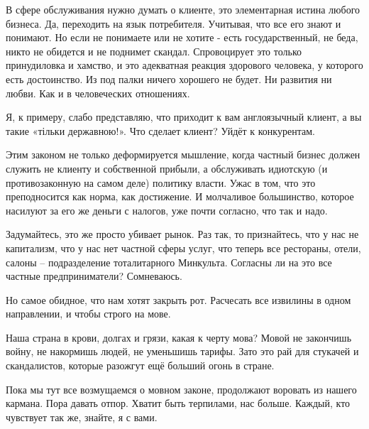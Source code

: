 В сфере обслуживания нужно думать о клиенте, это элементарная истина любого
бизнеса. Да, переходить на язык потребителя. Учитывая, что все его знают и
понимают. Но если не понимаете или не хотите - есть государственный, не беда,
никто не обидется и не поднимет скандал. Спровоцирует это только принудиловка и
хамство, и это адекватная реакция здорового человека, у которого есть
достоинство. Из под палки ничего хорошего не будет. Ни развития ни любви. Как и
в человеческих отношениях.

Я, к примеру, слабо представляю, что приходит к вам англоязычный клиент, а вы
такие «тільки державною!». Что сделает клиент? Уйдёт к конкурентам. 

Этим законом не только деформируется мышление, когда частный бизнес должен
служить не клиенту и собственной прибыли, а обслуживать идиотскую (и
противозаконную на самом деле) политику власти. Ужас в том, что это
преподносится как норма, как достижение. И молчаливое большинство, которое
насилуют за его же деньги с налогов, уже почти согласно, что так и надо.  

Задумайтесь, это же просто убивает рынок. Раз так, то признайтесь, что у нас не
капитализм, что у нас нет частной сферы услуг, что теперь все рестораны, отели,
салоны – подразделение тоталитарного Минкульта. Согласны ли на это все частные
предприниматели? Сомневаюсь.

Но самое обидное, что нам хотят закрыть рот. Расчесать все извилины в одном
направлении, и чтобы строго на мове. 

Наша страна в крови, долгах и грязи, какая к черту мова? Мовой не закончишь
войну, не накормишь людей, не уменьшишь тарифы. Зато это рай для стукачей и
скандалистов, которые разожгут ещё больший огонь в стране. 

Пока мы тут все возмущаемся о мовном законе, продолжают воровать из нашего
кармана. Пора давать отпор. Хватит быть терпилами, нас больше. Каждый, кто
чувствует так же, знайте, я с вами.
